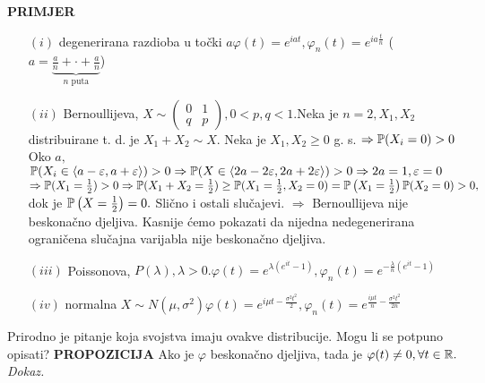 \documentclass{article}
\begin{document}
\textbf{PRIMJER}
\begin{enumerate}
    \item[\((i)\)] degenerirana razdioba u točki \(a\)\newline \(\varphi(t)=e^{iat},\varphi_n(t)=e^{ia\frac{t}n}\) (\(a=\underbrace{\frac{a}n+\cdot+\frac{a}n}_{n\text{ puta}}\))
    \item[\((ii)\)] Bernoullijeva, \(X\sim\begin{pmatrix}0&1\\q&p\end{pmatrix},0<p,q<1.\)\newline Neka je \(n=2,X_1,X_2\) distribuirane t. d. je \(X_1+X_2\sim X.\) Neka je \(X_1,X_2\ge0\) g. s. \(\Rightarrow\Bbb P(X_i=0)>0\)\newline Oko \(a,\) \(\Bbb P(X_i\in\langle a-\varepsilon,a+\varepsilon\rangle)>0\Rightarrow\Bbb P(X\in\langle2a-2\varepsilon,2a+2\varepsilon\rangle)>0\Rightarrow 2a=1,\varepsilon=0\)\newline \(\Rightarrow\Bbb P(X_1=\frac12)>0\Rightarrow\Bbb P(X_1+X_2=\frac12)\ge\Bbb P(X_1=\frac12,X_2=0)=\Bbb P\left(X_1=\frac12\right)\Bbb P(X_2=0)>0,\) dok je \(\Bbb P\left(X=\frac12\right)=0.\) Slično i ostali slučajevi. \(\Rightarrow\) Bernoullijeva nije beskonačno djeljiva. Kasnije ćemo pokazati da nijedna nedegenerirana ograničena slučajna varijabla nije beskonačno djeljiva.
    \item[\((iii)\)] Poissonova, \(P(\lambda),\lambda>0.\)\newline \(\varphi(t)=e^{\lambda\left(e^{it}-1\right)},\varphi_n(t)=e^{-\frac\lambda{n}\left(e^{it}-1\right)}\)
    \item[\((iv)\)] normalna \(X\sim N(\mu,\sigma^2)\)\newline \(\varphi(t)=e^{i\mu t-\frac{\sigma^2t^2}2},\varphi_n(t)=e^{\frac{i\mu t}n-\frac{\sigma^2t^2}{2n}}\)
\end{enumerate}
Prirodno je pitanje koja svojstva imaju ovakve distribucije. Mogu li se potpuno opisati?\newline
\textbf{PROPOZICIJA}\newline
Ako je \(\varphi\) beskonačno djeljiva, tada je \(\varphi(t)\ne0,\forall t\in\Bbb R.\)\newline\newline
\textit{Dokaz.}\newline
\end{document}
